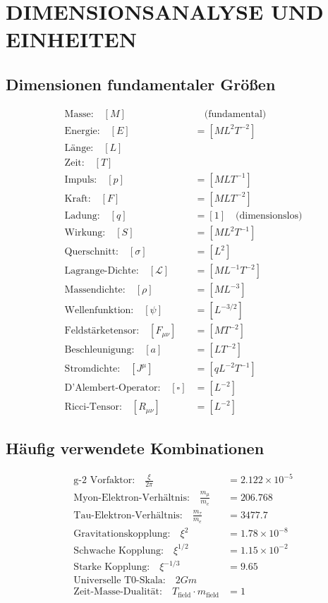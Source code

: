 \documentclass[12pt,a4paper]{article}
\begin{document}
	\section{DIMENSIONSANALYSE UND EINHEITEN}
	
	\subsection{Dimensionen fundamentaler Größen}
	\begin{align}
		\text{Masse:} \quad [M] &\quad \text{(fundamental)} \\
		\text{Energie:} \quad [E] &= [ML^2T^{-2}] \\
		\text{Länge:} \quad [L] & \\
		\text{Zeit:} \quad [T] & \\
		\text{Impuls:} \quad [p] &= [MLT^{-1}] \\
		\text{Kraft:} \quad [F] &= [MLT^{-2}] \\
		\text{Ladung:} \quad [q] &= [1] \quad \text{(dimensionslos)} \\
		\text{Wirkung:} \quad [S] &= [ML^2T^{-1}] \\
		\text{Querschnitt:} \quad [\sigma] &= [L^2] \\
		\text{Lagrange-Dichte:} \quad [\mathcal{L}] &= [ML^{-1}T^{-2}] \\
		\text{Massendichte:} \quad [\rho] &= [ML^{-3}] \\
		\text{Wellenfunktion:} \quad [\psi] &= [L^{-3/2}] \\
		\text{Feldstärketensor:} \quad [F_{\mu\nu}] &= [MT^{-2}] \\
		\text{Beschleunigung:} \quad [a] &= [LT^{-2}] \\
		\text{Stromdichte:} \quad [J^\mu] &= [qL^{-2}T^{-1}] \\
		\text{D'Alembert-Operator:} \quad [\square] &= [L^{-2}] \\
		\text{Ricci-Tensor:} \quad [R_{\mu\nu}] &= [L^{-2}]
	\end{align}
	
	\subsection{Häufig verwendete Kombinationen}
	\begin{align}
		\text{g-2 Vorfaktor:} \quad \frac{\xi}{2\pi} &= 2.122 \times 10^{-5} \\
		\text{Myon-Elektron-Verhältnis:} \quad \frac{m_\mu}{m_e} &= 206.768 \\
		\text{Tau-Elektron-Verhältnis:} \quad \frac{m_\tau}{m_e} &= 3477.7 \\
		\text{Gravitationskopplung:} \quad \xi^2 &= 1.78 \times 10^{-8} \\
		\text{Schwache Kopplung:} \quad \xi^{1/2} &= 1.15 \times 10^{-2} \\
		\text{Starke Kopplung:} \quad \xi^{-1/3} &= 9.65 \\
		\text{Universelle T0-Skala:} \quad 2Gm & \\
		\text{Zeit-Masse-Dualität:} \quad T_{\text{field}} \cdot m_{\text{field}} &= 1
	\end{align}
\end{document}
